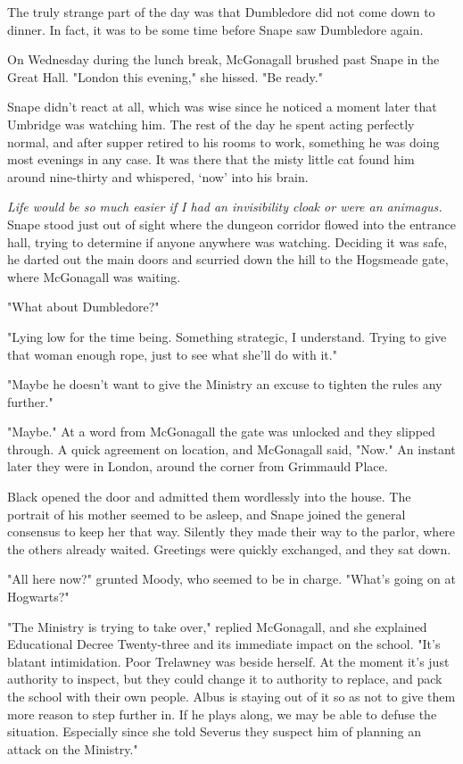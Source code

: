 The truly strange part of the day was that Dumbledore did not come down to dinner. In fact, it was to be some time before Snape saw Dumbledore again.

On Wednesday during the lunch break, McGonagall brushed past Snape in the Great Hall. "London this evening," she hissed. "Be ready."

Snape didn't react at all, which was wise since he noticed a moment later that Umbridge was watching him. The rest of the day he spent acting perfectly normal, and after supper retired to his rooms to work, something he was doing most evenings in any case. It was there that the misty little cat found him around nine-thirty and whispered, `now' into his brain.

\emph{Life would be so much easier if I had an invisibility cloak or were an animagus.} Snape stood just out of sight where the dungeon corridor flowed into the entrance hall, trying to determine if anyone anywhere was watching. Deciding it was safe, he darted out the main doors and scurried down the hill to the Hogsmeade gate, where McGonagall was waiting.

"What about Dumbledore?"

"Lying low for the time being. Something strategic, I understand. Trying to give that woman enough rope, just to see what she'll do with it."

"Maybe he doesn't want to give the Ministry an excuse to tighten the rules any further."

"Maybe." At a word from McGonagall the gate was unlocked and they slipped through. A quick agreement on location, and McGonagall said, "Now." An instant later they were in London, around the corner from Grimmauld Place.

Black opened the door and admitted them wordlessly into the house. The portrait of his mother seemed to be asleep, and Snape joined the general consensus to keep her that way. Silently they made their way to the parlor, where the others already waited. Greetings were quickly exchanged, and they sat down.

"All here now?" grunted Moody, who seemed to be in charge. "What's going on at Hogwarts?"

"The Ministry is trying to take over," replied McGonagall, and she explained Educational Decree Twenty-three and its immediate impact on the school. "It's blatant intimidation. Poor Trelawney was beside herself. At the moment it's just authority to inspect, but they could change it to authority to replace, and pack the school with their own people. Albus is staying out of it so as not to give them more reason to step further in. If he plays along, we may be able to defuse the situation. Especially since she told Severus they suspect him of planning an attack on the Ministry."

